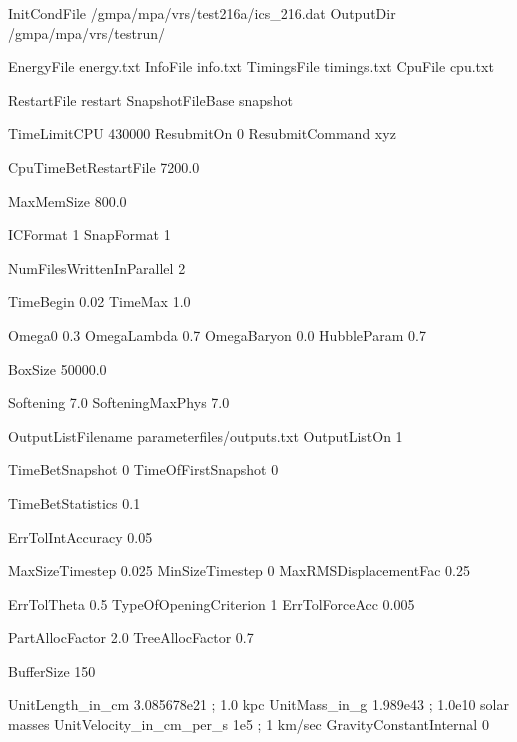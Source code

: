 

InitCondFile             /gmpa/mpa/vrs/test216a/ics_216.dat
OutputDir                /gmpa/mpa/vrs/testrun/

EnergyFile        energy.txt
InfoFile          info.txt
TimingsFile       timings.txt
CpuFile           cpu.txt

RestartFile       restart
SnapshotFileBase  snapshot


TimeLimitCPU      430000
ResubmitOn        0
ResubmitCommand   xyz

CpuTimeBetRestartFile  7200.0


MaxMemSize        800.0  %


ICFormat              1       %
SnapFormat            1       %

NumFilesWrittenInParallel 2   %



TimeBegin           0.02
TimeMax	            1.0

Omega0	              0.3
OmegaLambda           0.7
OmegaBaryon           0.0
HubbleParam           0.7

BoxSize                50000.0

Softening             7.0
SofteningMaxPhys      7.0


OutputListFilename  parameterfiles/outputs.txt
OutputListOn        1

TimeBetSnapshot        0
TimeOfFirstSnapshot    0
 
TimeBetStatistics      0.1



ErrTolIntAccuracy       0.05

MaxSizeTimestep        0.025 
MinSizeTimestep        0
MaxRMSDisplacementFac  0.25



ErrTolTheta            0.5
TypeOfOpeningCriterion 1
ErrTolForceAcc         0.005



PartAllocFactor       2.0
TreeAllocFactor       0.7

BufferSize            150  %


UnitLength_in_cm         3.085678e21        ;  1.0 kpc
UnitMass_in_g            1.989e43           ;  1.0e10 solar masses
UnitVelocity_in_cm_per_s 1e5                ;  1 km/sec
GravityConstantInternal  0





